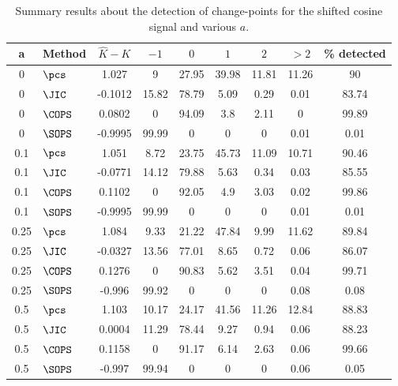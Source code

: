 \begin{table}[ht]
\centering
\begin{tabular}{clccccccc}
  \hline
a & Method & $\hat{K} - K$ & $-1$ & $0$ & $1$ & $2$ & $> 2$ & \% detected \\ 
  \hline
0 & $\pcs$ & 1.027 &     9 & 27.95 & 39.98 & 11.81 & 11.26 &    90 \\ 
  0 & $\JIC$ & -0.1012 & 15.82 & 78.79 &  5.09 &  0.29 &  0.01 & 83.74 \\ 
  0 & $\COPS$ & 0.0802 &     0 & 94.09 &   3.8 &  2.11 &     0 & 99.89 \\ 
  0 & $\SOPS$ & -0.9995 & 99.99 &     0 &     0 &     0 &  0.01 &  0.01 \\ 
   \hline
0.1 & $\pcs$ & 1.051 &  8.72 & 23.75 & 45.73 & 11.09 & 10.71 & 90.46 \\ 
  0.1 & $\JIC$ & -0.0771 & 14.12 & 79.88 &  5.63 &  0.34 &  0.03 & 85.55 \\ 
  0.1 & $\COPS$ & 0.1102 &     0 & 92.05 &   4.9 &  3.03 &  0.02 & 99.86 \\ 
  0.1 & $\SOPS$ & -0.9995 & 99.99 &     0 &     0 &     0 &  0.01 &  0.01 \\ 
   \hline
0.25 & $\pcs$ & 1.084 &  9.33 & 21.22 & 47.84 &  9.99 & 11.62 & 89.84 \\ 
  0.25 & $\JIC$ & -0.0327 & 13.56 & 77.01 &  8.65 &  0.72 &  0.06 & 86.07 \\ 
  0.25 & $\COPS$ & 0.1276 &     0 & 90.83 &  5.62 &  3.51 &  0.04 & 99.71 \\ 
  0.25 & $\SOPS$ & -0.996 & 99.92 &     0 &     0 &     0 &  0.08 &  0.08 \\ 
   \hline
0.5 & $\pcs$ & 1.103 & 10.17 & 24.17 & 41.56 & 11.26 & 12.84 & 88.83 \\ 
  0.5 & $\JIC$ & 0.0004 & 11.29 & 78.44 &  9.27 &  0.94 &  0.06 & 88.23 \\ 
  0.5 & $\COPS$ & 0.1158 &     0 & 91.17 &  6.14 &  2.63 &  0.06 & 99.66 \\ 
  0.5 & $\SOPS$ & -0.997 & 99.94 &     0 &     0 &     0 &  0.06 &  0.05 \\ 
   \hline
\end{tabular}
\caption{Summary results about the detection of change-points for the shifted cosine signal and various $a$.} 
\label{tab:CProbustness}
\end{table}
